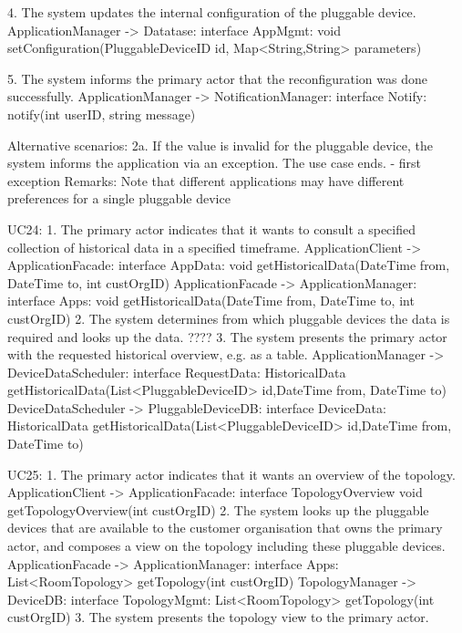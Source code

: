             4. The system updates the internal configuration of the pluggable device.
                ApplicationManager -> Datatase: interface AppMgmt:
                                                     void setConfiguration(PluggableDeviceID id, Map<String,String> parameters) 
            
            5. The system informs the primary actor that the reconfiguration was done successfully.  
                ApplicationManager -> NotificationManager: interface Notify: notify(int userID, string message)  
         
            Alternative scenarios:
            2a. If the value is invalid for the pluggable device, the system informs the application via an
                exception. The use case ends.
                - first exception
            Remarks:
                Note that different applications may have different preferences for a single pluggable device
        
        UC24:
            1. The primary actor indicates that it wants to consult a specified collection of historical data in
                a specified timeframe.
                ApplicationClient -> ApplicationFacade: interface AppData:
                                                void getHistoricalData(DateTime from, DateTime to, int custOrgID)
                ApplicationFacade -> ApplicationManager: interface Apps:
                                                void getHistoricalData(DateTime from, DateTime to, int custOrgID)
            2. The system determines from which pluggable devices the data is required and looks up the data.
                 ????
            3. The system presents the primary actor with the requested historical overview, e.g. as a table.
                ApplicationManager -> DeviceDataScheduler: interface RequestData:
                                      HistoricalData getHistoricalData(List<PluggableDeviceID> id,DateTime from, DateTime to)
                DeviceDataScheduler -> PluggableDeviceDB: interface DeviceData:
                                      HistoricalData getHistoricalData(List<PluggableDeviceID> id,DateTime from, DateTime to) 
                
        UC25:
            1. The primary actor indicates that it wants an overview of the topology.
                ApplicationClient -> ApplicationFacade: interface TopologyOverview
                                                               void getTopologyOverview(int custOrgID)
            2. The system looks up the pluggable devices that are available to the customer organisation
           that owns the primary actor, and composes a view on the topology including these pluggable devices.
                ApplicationFacade -> ApplicationManager: interface Apps: List<RoomTopology> getTopology(int custOrgID)
                TopologyManager -> DeviceDB: interface TopologyMgmt: List<RoomTopology> getTopology(int custOrgID) 
            3. The system presents the topology view to the primary actor.
        

